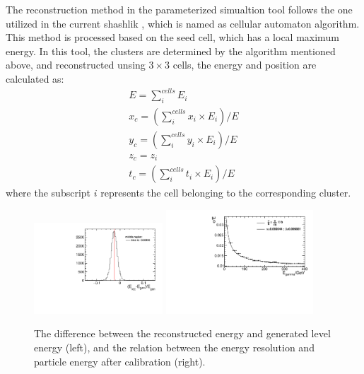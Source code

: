 The reconstruction method in the parameterized simualtion tool follows the one utilized in the current shashlik \ecal,
which is named as cellular automaton algorithm\supercite{Breton:2001tua,Deschamps:691634}.
This method is processed based on the seed cell, 
which has a local maximum energy.
In this tool,
the clusters are determined by the algorithm mentioned above,
and reconstructed unsing $3\times3$ cells,
the energy and position are calculated as:
\begin{equation}
\label{eq:rec}
\begin{split}
   E = \sum_{i}^{cells}{E_i} \\
   x_{c} = (\sum_{i}^{cells}{x_i \times E_i})/E \\
   y_{c} = (\sum_{i}^{cells}{y_i \times E_i})/E \\
   z_{c} = z_i \\
   t_{c} = (\sum_{i}^{cells}{t_i \times E_i})/E
\end{split}
\end{equation}
where the subscript $i$ represents the cell belonging to the corresponding cluster.

\begin{figure}[!thbp]
\centering
\includegraphics[width=0.43\textwidth]{Figures/06_ECAL/fast_sim/for_fast_cali/energy_cali/energy_cali/middle_energy.pdf}
\includegraphics[width=0.49\textwidth]{Figures/06_ECAL/fast_sim/for_fast_cali/energy_cali/res_ene.pdf}
   \caption{The difference between the reconstructed energy and generated level energy  (left),
   and the relation between the energy resolution and particle energy after calibration (right).}
\label{fig:fast_ene_cali}
\end{figure}

